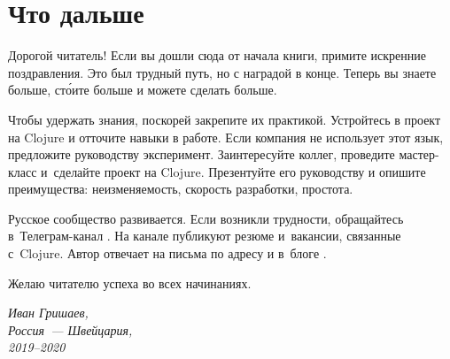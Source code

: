 \chapter{Что дальше}

Дорогой читатель! Если вы дошли сюда от начала книги, примите искренние
поздравления. Это был трудный путь, но с наградой в конце. Теперь вы знаете
больше, ст\'{о}ите больше и можете сделать больше.

Чтобы удержать знания, поскорей закрепите их практикой. Устройтесь в проект на
Clojure и отточите навыки в работе. Если компания не использует этот язык,
предложите руководству эксперимент. Заинтересуйте коллег, проведите мастер-класс
и~сделайте проект на Clojure. Презентуйте его руководству и опишите
преимущества: неизменяемость, скорость разработки, простота.

Русское сообщество развивается. Если возникли трудности, обращайтесь
в~Телеграм-канал . На канале  публикуют
резюме и~вакансии, связанные с~Clojure. Автор отвечает на письма по адресу
\emaillink\xspace и в~блоге \sitelink.

Желаю читателю успеха во всех начинаниях.

\vspace{1em}

\noindent

\hspace{\fill}\parbox{4cm}{\textit{Иван Гришаев,\\Россия~--- Швейцария,\\2019--2020}}
